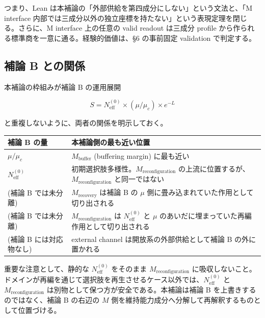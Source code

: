 \documentclass[12pt,a4paper]{article}
\begin{document}
つまり、Lean は本補論の「外部供給を第四成分にしない」という文法と、「M interface 内部では三成分以外の独立座標を持たない」という表現定理を閉じる。さらに、M interface 上の任意の valid readout は三成分 profile から作られる標準商を一意に通る。経験的価値は、§6 の事前固定 validation で判定する。

\subsection{補論 B との関係}\label{ux88dcux8ad6-b-ux3068ux306eux95a2ux4fc2}

本補論の枠組みが補論 B の運用展開

\[
S = N_{\mathrm{eff}}^{(0)} \times (\mu/\mu_{c}) \times e^{-L}
\]

と重複しないように、両者の関係を明示しておく。

{\def\LTcaptype{table} %
\begin{longtable}[]{@{}
  >{\raggedright\arraybackslash}p{}
  >{\raggedright\arraybackslash}p{}@{}}
\toprule\noalign{}
\begin{minipage}[b]{\linewidth}\raggedright
補論 B の量
\end{minipage} & \begin{minipage}[b]{\linewidth}\raggedright
本補論側の最も近い位置
\end{minipage} \\
\midrule\noalign{}
\endhead
\bottomrule\noalign{}
\endlastfoot
\(\mu / \mu_c\) & \(M_{\mathrm{buffer}}\) (buffering margin) に最も近い \\
\(N_{\mathrm{eff}}^{(0)}\) & 初期選択肢多様性。\(M_{\mathrm{reconfiguration}}\) の上流に位置するが、\(M_{\mathrm{reconfiguration}}\) と同一ではない \\
(補論 B では未分離) & \(M_{\mathrm{recovery}}\) は補論 B の \(\mu\) 側に畳み込まれていた作用として切り出される \\
(補論 B では未分離) & \(M_{\mathrm{reconfiguration}}\) は \(N_{\mathrm{eff}}^{(0)}\) と \(\mu\) のあいだに埋まっていた再編作用として切り出される \\
(補論 B には対応物なし) & external channel は開放系の外部供給として補論 B の外に置かれる \\
\end{longtable}
}

重要な注意として、静的な \(N_{\mathrm{eff}}^{(0)}\) をそのまま \(M_{\mathrm{reconfiguration}}\) に吸収しないこと。ドメインが再編を通じて選択肢を再生させるケース以外では、\(N_{\mathrm{eff}}^{(0)}\) と \(M_{\mathrm{reconfiguration}}\) は別物として保つ方が安全である。本補論は補論 B を上書きするのではなく、補論 B の右辺の \(M\) 側を維持能力成分へ分解して再解釈するものとして位置づける。
\end{document}
